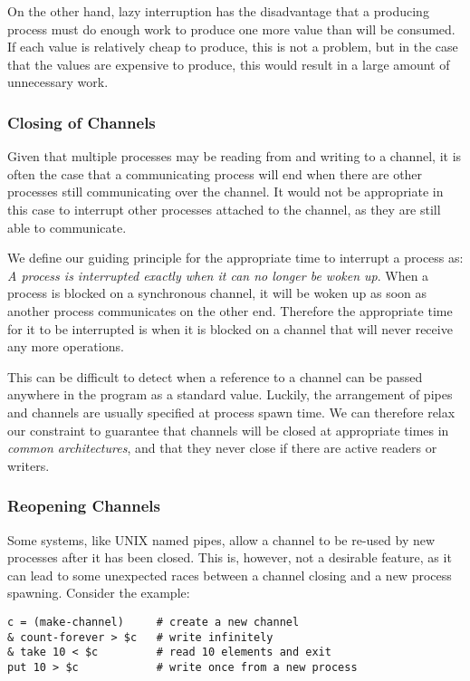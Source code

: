 \ifsigpro{ \documentclass[english,PRO]{ipsj} }
\begin{document}
On the other hand, lazy interruption has the disadvantage that a producing process must do enough work to produce one more value than will be consumed. If each value is relatively cheap to produce, this is not a problem, but in the case that the values are expensive to produce, this would result in a large amount of unnecessary work.



\subsubsection{Closing of Channels}\label{closing}\noindent
Given that multiple processes may be reading from and writing to a channel, it is often the case that a communicating process will end when there are other processes still communicating over the channel. It would not be appropriate in this case to interrupt other processes attached to the channel, as they are still able to communicate.

We define our guiding principle for the appropriate time to interrupt a process as: \emph{A process is interrupted exactly when it can no longer be woken up}.
When a process is blocked on a synchronous channel, it will be woken up as soon as another process communicates on the other end.
Therefore the appropriate time for it to be interrupted is when it is blocked on a channel that will never receive any more operations.

This can be difficult to detect when a reference to a channel can be passed anywhere in the program as a standard value. Luckily, the arrangement of pipes and channels are usually specified at process spawn time. We can therefore relax our constraint to guarantee that channels will be closed at appropriate times in \emph{common architectures}, and that they never close if there are active readers or writers.

\subsubsection{Reopening Channels}\label{closing-permanence}\noindent
Some systems, like UNIX named pipes, allow a channel to be re-used by new processes after it has been closed\cite{linux-pipe}. This is, however, not a desirable feature, as it can lead to some unexpected races between a channel closing and a new process spawning. Consider the example:
\begin{lstlisting}
c = (make-channel)     # create a new channel
& count-forever > $c   # write infinitely
& take 10 < $c         # read 10 elements and exit
put 10 > $c            # write once from a new process
\end{lstlisting}
\end{document}
